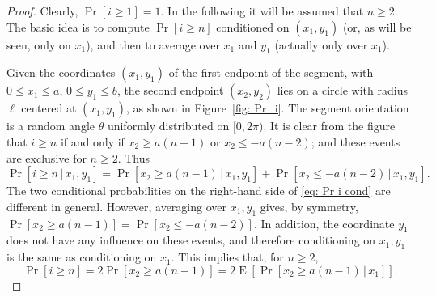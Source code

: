 \documentclass[12pt, a4paper]{article}
\newcommand{\cond}{\,|\,} %
\DeclareMathOperator{\E}{E}
\newcommand{\len}{\ell} %
\begin{document}
\begin{proof}
Clearly, $\Pr[i \geq 1]=1$. In the following it will be assumed that $n \geq 2$. The basic idea is to compute $\Pr[i \geq n]$ conditioned on $(x_1,y_1)$ (or, as will be seen, only on $x_1$), and then to average over $x_1$ and $y_1$ (actually only over $x_1$).

Given the coordinates $(x_1, y_1)$ of the first endpoint of the segment, with $0 \leq x_1 \leq a$, $0 \leq y_1 \leq b$, the second endpoint $(x_2, y_2)$ lies on a circle with radius $\len$ centered at $(x_1,y_1)$, as shown in Figure~\ref{fig: Pr_i}. The segment orientation is a random angle $\theta$ uniformly distributed on $[0,2\pi)$. It is clear from the figure that $i \geq n$ if and only if $x_2 \geq a(n-1)$ or $x_2 \leq -a(n-2)$; and these events are exclusive for $n \geq 2$. Thus
\begin{equation}
\label{eq: Pr i cond}
\Pr[i \geq n \cond x_1, y_1] = \Pr[x_2 \geq a(n-1) \cond x_1, y_1] + \Pr[x_2 \leq -a(n-2) \cond x_1, y_1].
\end{equation}
The two conditional probabilities on the right-hand side of \eqref{eq: Pr i cond} are different in general. However, averaging over $x_1, y_1$ gives, by symmetry, $\Pr[x_2 \geq a(n-1)] = \Pr[x_2 \leq -a(n-2)]$. In addition, the coordinate $y_1$ does not have any influence on these events, and therefore conditioning on $x_1, y_1$ is the same as conditioning on $x_1$. This implies that, for $n \geq 2$,
\begin{equation}
\label{eq: Pr i = 2 Pr}
\Pr[i \geq n] = 2 \Pr[x_2 \geq a(n-1)] = 2 \E[\Pr[x_2 \geq a(n-1) \cond x_1]].
\end{equation}


\end{proof}
\end{document}
